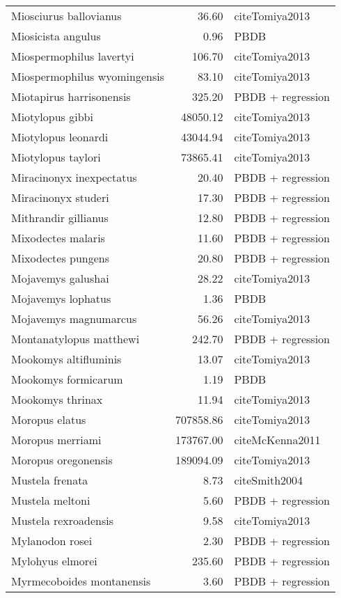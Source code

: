 \begin{table}[ht]
\begin{tabular}{lrl}
  Miosciurus ballovianus & 36.60 & cite{Tomiya2013} \\ 
  Miosicista angulus & 0.96 & PBDB \\ 
  Miospermophilus lavertyi & 106.70 & cite{Tomiya2013} \\ 
  Miospermophilus wyomingensis & 83.10 & cite{Tomiya2013} \\ 
  Miotapirus harrisonensis & 325.20 & PBDB + regression \\ 
  Miotylopus gibbi & 48050.12 & cite{Tomiya2013} \\ 
  Miotylopus leonardi & 43044.94 & cite{Tomiya2013} \\ 
  Miotylopus taylori & 73865.41 & cite{Tomiya2013} \\ 
  Miracinonyx inexpectatus & 20.40 & PBDB + regression \\ 
  Miracinonyx studeri & 17.30 & PBDB + regression \\ 
  Mithrandir gillianus & 12.80 & PBDB + regression \\ 
  Mixodectes malaris & 11.60 & PBDB + regression \\ 
  Mixodectes pungens & 20.80 & PBDB + regression \\ 
  Mojavemys galushai & 28.22 & cite{Tomiya2013} \\ 
  Mojavemys lophatus & 1.36 & PBDB \\ 
  Mojavemys magnumarcus & 56.26 & cite{Tomiya2013} \\ 
  Montanatylopus matthewi & 242.70 & PBDB + regression \\ 
  Mookomys altifluminis & 13.07 & cite{Tomiya2013} \\ 
  Mookomys formicarum & 1.19 & PBDB \\ 
  Mookomys thrinax & 11.94 & cite{Tomiya2013} \\ 
  Moropus elatus & 707858.86 & cite{Tomiya2013} \\ 
  Moropus merriami & 173767.00 & cite{McKenna2011} \\ 
  Moropus oregonensis & 189094.09 & cite{Tomiya2013} \\ 
  Mustela frenata & 8.73 & cite{Smith2004} \\ 
  Mustela meltoni & 5.60 & PBDB + regression \\ 
  Mustela rexroadensis & 9.58 & cite{Tomiya2013} \\ 
  Mylanodon rosei & 2.30 & PBDB + regression \\ 
  Mylohyus elmorei & 235.60 & PBDB + regression \\ 
  Myrmecoboides montanensis & 3.60 & PBDB + regression \\ 

\end{tabular}
\end{table}
